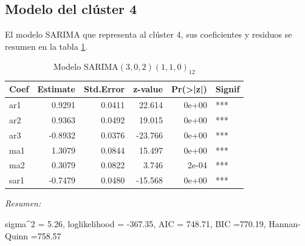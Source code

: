 \documentclass[12pt,oneside]{book}\usepackage[]{graphicx}\usepackage[]{color}
\newenvironment{knitrout}{}{} %
\theoremstyle{definition} %
\begin{document}
\subsection{Modelo del clúster 4}


El modelo SARIMA que representa al clúster 4, sus coeficientes y residuos se resumen en la tabla \ref{tab:sarima_cl4}.



\begin{knitrout}
\color{fgcolor}\begin{table}

\caption{\label{tab:unnamed-chunk-91}\label{tab:sarima_cl4}Modelo SARIMA$(3,0,2)(1,1,0)_{12}$}
\centering
\begin{threeparttable}
\begin{tabular}[t]{lrrrrl}
\toprule
Coef & Estimate & Std.Error & z-value & Pr(>|z|) & Signif\\
\midrule
\rowcolor{gray!6}  ar1 & 0.9291 & 0.0411 & 22.614 & 0e+00 & ***\\
ar2 & 0.9363 & 0.0492 & 19.015 & 0e+00 & ***\\
\rowcolor{gray!6}  ar3 & -0.8932 & 0.0376 & -23.766 & 0e+00 & ***\\
ma1 & 1.3079 & 0.0844 & 15.497 & 0e+00 & ***\\
\rowcolor{gray!6}  ma2 & 0.3079 & 0.0822 & 3.746 & 2e-04 & ***\\
\addlinespace
sar1 & -0.7479 & 0.0480 & -15.568 & 0e+00 & ***\\
\bottomrule
\end{tabular}
\begin{tablenotes}
\item \textit{Resumen:} 
\item sigma\textasciicircum{}2 = 5.26, loglikelihood = -367.35, AIC = 748.71, BIC =770.19, Hannan-Quinn =758.57
\end{tablenotes}
\end{threeparttable}
\end{table}


\end{knitrout}
\end{document}
